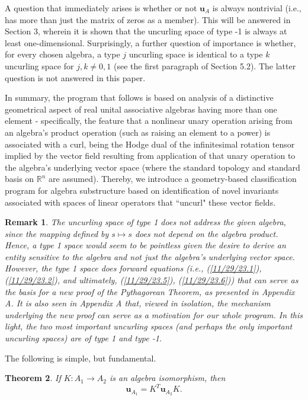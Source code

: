 \documentclass{amsart}
\numberwithin{equation}{section}
\newtheorem{theorem}{Theorem}
\newtheorem{remark}[theorem]{Remark}
\theoremstyle{definition}
\numberwithin{theorem}{section}
\begin{document}
A question that immediately arises is whether or not $\mathbf{u}_A$ is always nontrivial (i.e., has more than just the matrix of zeros as a member).  This will be answered in Section 3, wherein it is shown that the uncurling space of type -1 is always at least one-dimensional.  Surprisingly, a further question of importance is whether, for every chosen algebra, a type $j$ uncurling space is identical to a type $k$ uncurling space for $j,k\ne 0,1$ (see the first paragraph of Section 5.2).  The latter question is not answered in this paper.
      
         In summary, the program that follows is based on analysis of a distinctive geometrical aspect of real unital associative algebras having more than one element  - specifically, the feature that a nonlinear unary operation arising from an algebra's product operation (such as raising an element to a power) is associated with a curl, being the Hodge dual of the infinitesimal rotation tensor implied by the vector field resulting from application of that unary operation to the algebra's underlying vector space (where the standard topology and standard basis on $\mathbb{R}^n$ are assumed).   Thereby, we introduce a geometry-based classification program for algebra substructure based on identification of novel invariants associated with spaces of linear operators that ``uncurl" these vector fields.        

\begin{remark}\label{11/21/23.1} {\rm The uncurling space of type 1 does not address the given algebra, since the mapping defined by $s\mapsto s$ does not depend on the algebra product.  Hence, a type 1 space would seem to be pointless given the desire to derive an entity sensitive to the algebra and not just the algebra's underlying vector space.  However, the type 1 space does forward equations (i.e., (\ref{11/29/23.1}), (\ref{11/29/23.2}), and ultimately, (\ref{11/29/23.5}), (\ref{11/29/23.6})) that can serve as the basis for a new proof of the Pythagorean Theorem, as presented in Appendix A.  It is also seen in Appendix A that, viewed in isolation, the mechanism underlying the new proof can serve as a motivation for our whole program.  In this light, the two most important uncurling spaces (and perhaps the only important uncurling spaces) are of type 1 and type -1.}\end{remark}

The following is simple, but fundamental.


\begin{theorem} \label{6/6/23.1} If $K:A_1\rightarrow A_2$ is an algebra isomorphism, then \begin{equation}\label{5/23/23.1} \mathbf{u}_{A_1} = K^T \mathbf{u}_{A_2} K. \end{equation} \end{theorem}
\end{document}
